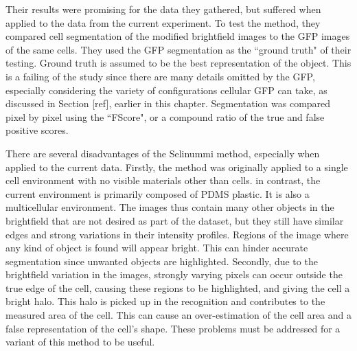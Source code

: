 Their results were promising for the data they gathered, but suffered when applied to the data from the current experiment. To test the method, they compared cell segmentation of the modified brightfield images to the GFP images of the same cells. They used the GFP segmentation as the ``ground truth" of their testing. Ground truth is assumed to be the best representation of the object. This is a failing of the study since there are many details omitted by the GFP, especially considering the variety of configurations cellular GFP can take, as discussed in Section [ref], earlier in this chapter. Segmentation was compared pixel by pixel using the ``FScore", or a compound ratio of the true and false positive scores.

There are several disadvantages of the Selinummi method, especially when applied to the current data. Firstly, the method was originally applied to a single cell environment with no visible materials other than cells. in contrast, the current environment is primarily composed of PDMS plastic. It is also a multicellular environment. The images thus contain many other objects in the brightfield that are not desired as part of the dataset, but they still have similar edges and strong variations in their intensity profiles. Regions of the image where any kind of object is found will appear bright. This can hinder accurate segmentation since unwanted objects are highlighted. Secondly, due to the brightfield variation in the images, strongly varying pixels can occur outside the true edge of the cell, causing these regions to be highlighted, and giving the cell a bright halo. This halo is picked up in the recognition and contributes to the measured area of the cell. This can cause an over-estimation of the cell area and a false representation of the cell's shape. These problems must be addressed for a variant of this method to be useful.
